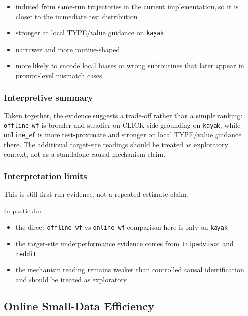 \begin{itemize}
\tightlist
\item
  induced from same-run trajectories in the current implementation, so
  it is closer to the immediate test distribution
\item
  stronger at local TYPE/value guidance on \texttt{kayak}
\item
  narrower and more routine-shaped
\item
  more likely to encode local biases or wrong subroutines that later
  appear in prompt-level mismatch cases
\end{itemize}

\subsubsection{Interpretive summary}

Taken together, the evidence suggests a trade-off rather than a simple
ranking: \texttt{offline\_wf} is broader and steadier on CLICK-side
grounding on \texttt{kayak}, while \texttt{online\_wf} is more
test-proximate and stronger on local TYPE/value guidance there. The
additional target-site readings should be treated as exploratory
context, not as a standalone causal mechanism claim.

\subsubsection{Interpretation limits}

This is still first-run evidence, not a repeated-estimate claim.

In particular:

\begin{itemize}
\tightlist
\item
  the direct \texttt{offline\_wf} vs \texttt{online\_wf} comparison here
  is only on \texttt{kayak}
\item
  the target-site underperformance evidence comes from \texttt{tripadvisor} and
  \texttt{reddit}
\item
  the mechanism reading remains weaker than controlled causal
  identification and should be treated as exploratory
\end{itemize}


\clearpage
\subsection{Online Small-Data Efficiency}\label{app:A8}

